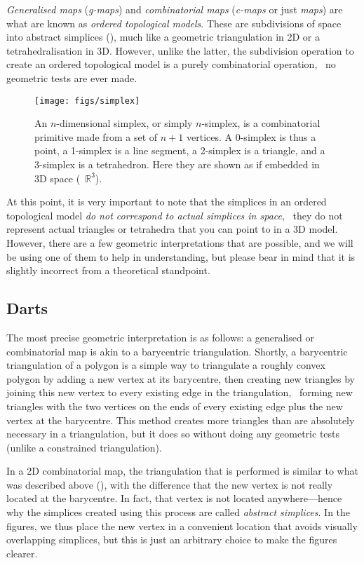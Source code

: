 \emph{Generalised maps} (\emph{g-maps}) and \emph{combinatorial maps} (\emph{c-maps} or just \emph{maps}) are what are known as \emph{ordered topological models}.
These are subdivisions of space into abstract simplices (), much like a geometric triangulation in 2D or a tetrahedralisation in 3D.
However, unlike the latter, the subdivision operation to create an ordered topological model is a purely combinatorial operation, \ie\ no geometric tests are ever made.

\begin{figure}
\centering
\texttt{[image: figs/simplex]}
\caption{An \(n\)-dimensional simplex, or simply \(n\)-simplex, is a combinatorial primitive made from a set of \(n+1\) vertices.
A 0-simplex is thus a point, a 1-simplex is a line segment, a 2-simplex is a triangle, and a 3-simplex is a tetrahedron.
Here they are shown as if embedded in 3D space (\ie\ \(\mathbb{R}^3\)).}%
\label{fig:simplices}
\end{figure}

At this point, it is very important to note that the simplices in an ordered topological model \emph{do not correspond to actual simplices in space}, \ie\ they do not represent actual triangles or tetrahedra that you can point to in a 3D model.
However, there are a few geometric interpretations that are possible, and we will be using one of them to help in understanding, but please bear in mind that it is slightly incorrect from a theoretical standpoint.

\subsection{Darts}

The most precise geometric interpretation is as follows: a generalised or combinatorial map is akin to a barycentric triangulation.
Shortly, a barycentric triangulation of a polygon is a simple way to triangulate a roughly convex polygon by adding a new vertex at its barycentre, then creating new triangles by joining this new vertex to every existing edge in the triangulation, \ie\ forming new triangles with the two vertices on the ends of every existing edge plus the new vertex at the barycentre.
This method creates more triangles than are absolutely necessary in a triangulation, but it does so without doing any geometric tests (unlike a constrained triangulation).

In a 2D combinatorial map, the triangulation that is performed is similar to what was described above (), with the difference that the new vertex is not really located at the barycentre.
In fact, that vertex is not located anywhere---hence why the simplices created using this process are called \emph{abstract simplices}.
In the figures, we thus place the new vertex in a convenient location that avoids visually overlapping simplices, but this is just an arbitrary choice to make the figures clearer.

